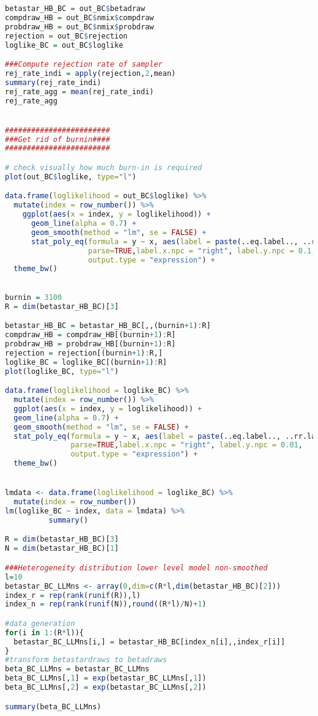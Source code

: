 \begin{lstlisting}[language=R,caption={Estimation of the hierarchical Bayesian MNL model and MCMC sampling routine}, label=lst_betas]
betastar_HB_BC = out_BC$betadraw
compdraw_HB = out_BC$nmix$compdraw
probdraw_HB = out_BC$nmix$probdraw
rejection = out_BC$rejection
loglike_BC = out_BC$loglike

###Compute rejection rate of sampler 
rej_rate_indi = apply(rejection,2,mean)
summary(rej_rate_indi)
rej_rate_agg = mean(rej_rate_indi)
rej_rate_agg


########################
###Get rid of burnin####
########################

# check visually how much burn-in is required
plot(out_BC$loglike, type="l")

data.frame(loglikelihood = out_BC$loglike) %>% 
  mutate(index = row_number()) %>% 
    ggplot(aes(x = index, y = loglikelihood)) +
      geom_line(alpha = 0.7) +
      geom_smooth(method = "lm", se = FALSE) +
      stat_poly_eq(formula = y ~ x, aes(label = paste(..eq.label.., ..rr.label.., sep = "~~~~~~")), 
                   parse=TRUE,label.x.npc = "right", label.y.npc = 0.1,
                   output.type = "expression") +
  theme_bw()
      

burnin = 3100
R = dim(betastar_HB_BC)[3]

betastar_HB_BC = betastar_HB_BC[,,(burnin+1):R]
compdraw_HB = compdraw_HB[(burnin+1):R]
probdraw_HB = probdraw_HB[(burnin+1):R]
rejection = rejection[(burnin+1):R,]
loglike_BC = loglike_BC[(burnin+1):R]
plot(loglike_BC, type="l")

data.frame(loglikelihood = loglike_BC) %>% 
  mutate(index = row_number()) %>% 
  ggplot(aes(x = index, y = loglikelihood)) +
  geom_line(alpha = 0.7) +
  geom_smooth(method = "lm", se = FALSE) +
  stat_poly_eq(formula = y ~ x, aes(label = paste(..eq.label.., ..rr.label.., sep = "~~~~~~")), 
               parse=TRUE,label.x.npc = "right", label.y.npc = 0.01,
               output.type = "expression") +
  theme_bw()


lmdata <- data.frame(loglikelihood = loglike_BC) %>% 
  mutate(index = row_number())
lm(loglike_BC ~ index, data = lmdata) %>% 
          summary()

R = dim(betastar_HB_BC)[3]
N = dim(betastar_HB_BC)[1]

###Heterogeneity distribution lower level model non-smoothed  
l=10
betastar_BC_LLMns <- array(0,dim=c(R*l,dim(betastar_HB_BC)[2]))
index_r = rep(rank(runif(R)),l)
index_n = rep(rank(runif(N)),round((R*l)/N)+1)

#data generation
for(i in 1:(R*l)){
  betastar_BC_LLMns[i,] = betastar_HB_BC[index_n[i],,index_r[i]]
}
#transform betastardraws to betadraws
beta_BC_LLMns = betastar_BC_LLMns
beta_BC_LLMns[,1] = exp(betastar_BC_LLMns[,1])
beta_BC_LLMns[,2] = exp(betastar_BC_LLMns[,2])

summary(beta_BC_LLMns)
\end{lstlisting}